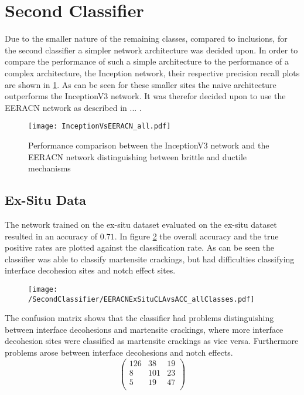 \newpage
\section{Second Classifier}
Due to the smaller nature of the remaining classes, compared to inclusions, for the second classifier a simpler network architecture was decided upon. In order to compare the performance of such a simple architecture to the performance of a complex architecture, the Inception network, their respective precision recall plots are shown in \ref{fig:InVsEE}. As can be seen for these smaller sites the naive architecture outperforms the InceptionV3 network. It was therefor decided upon to use the EERACN network as described in ... .


\begin{figure}[H]
  \texttt{[image: InceptionVsEERACN\_all.pdf]}
\caption{Performance comparison between the InceptionV3 network and the EERACN network distinguishing between brittle and ductile mechanisms}
\label{fig:InVsEE}
\end{figure}

\subsection{Ex-Situ Data}
The network trained on the ex-situ dataset evaluated on the ex-situ dataset resulted in an accuracy of $0.71$. In figure \ref{fig:EERACNExSituCLAvsACC_allClasses} the overall accuracy and the true positive rates are plotted against the classification rate. As can be seen the classifier was able to classify martensite crackings, but had difficulties classifying interface decohesion sites and notch effect sites. \\
\begin{figure}[H]
\centering
\texttt{[image: /SecondClassifier/EERACNExSituCLAvsACC\_allClasses.pdf]}
\caption{}
\label{fig:EERACNExSituCLAvsACC_allClasses}
\end{figure}
The confusion matrix shows that the classifier had problems distinguishing between interface decohesions and martensite crackings, where more interface decohesion sites were classified as martensite crackings as vice versa. Furthermore problems arose between interface decohesions and notch effects. \\

\begin{equation}
\begin{pmatrix}
126 & 38 & 19 \\
8 & 101 & 23 \\
5 & 19 & 47 \\
\end{pmatrix}
\end{equation}

